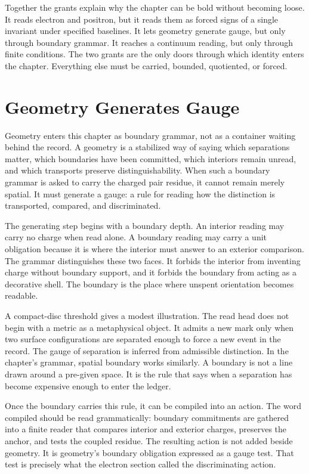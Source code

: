 Together the grants explain why the chapter can be bold without becoming
loose. It reads electron and positron, but it reads them as forced signs of a
single invariant under specified baselines. It lets geometry generate gauge,
but only through boundary grammar. It reaches a continuum reading, but only
through finite conditions. The two grants are the only doors through which
identity enters the chapter. Everything else must be carried, bounded,
quotiented, or forced.

\section{Geometry Generates Gauge}

Geometry enters this chapter as boundary grammar, not as a container waiting
behind the record. A geometry is a stabilized way of saying which separations
matter, which boundaries have been committed, which interiors remain
unread, and which transports preserve distinguishability. When such a
boundary grammar is asked to carry the charged pair residue, it cannot remain
merely spatial. It must generate a gauge: a rule for reading how the
distinction is transported, compared, and discriminated.

The generating step begins with a boundary depth. An interior reading may
carry no charge when read alone. A boundary reading may carry a unit
obligation because it is where the interior must answer to an exterior
comparison. The grammar distinguishes these two faces. It forbids the
interior from inventing charge without boundary support, and it forbids the
boundary from acting as a decorative shell. The boundary is the place where
unspent orientation becomes readable.

A compact-disc threshold gives a modest illustration. The read head does not
begin with a metric as a metaphysical object. It admits a new mark only when
two surface configurations are separated enough to force a new event in the
record. The gauge of separation is inferred from admissible distinction. In
the chapter's grammar, spatial boundary works similarly. A boundary is not a
line drawn around a pre-given space. It is the rule that says when a
separation has become expensive enough to enter the ledger.

Once the boundary carries this rule, it can be compiled into an action. The
word compiled should be read grammatically: boundary commitments are gathered
into a finite reader that compares interior and exterior charges, preserves
the anchor, and tests the coupled residue. The resulting action is not added
beside geometry. It is geometry's boundary obligation expressed as a gauge
test. That test is precisely what the electron section called the
discriminating action.

